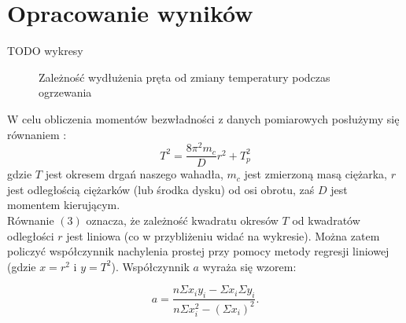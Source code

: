 \documentclass[10pt,a4paper]{article}
\newcommand{\forceindent}{\leavevmode{\parindent=3em\indent}}
\begin{document}
\section{Opracowanie wyników}
TODO wykresy
\begin{figure}[!h]
\centering
{}
\caption{Zależność wydłużenia pręta od zmiany temperatury podczas ogrzewania}
\label{fig:wyk}
\end{figure}

\forceindent W celu obliczenia momentów bezwładności z danych pomiarowych posłużymy się równaniem :
\begin{equation}
T^2 = \frac{8 \pi^2 m_c}{D}r^2 + T_p^2
\end{equation}
gdzie $T$ jest okresem drgań naszego wahadła, $m_c$ jest zmierzoną masą ciężarka, $r$ jest odległością ciężarków (lub środka dysku) od osi obrotu, zaś $D$ jest momentem kierującym.\\
\forceindent Równanie $(3)$ oznacza, że zależność kwadratu okresów $T$ od kwadratów odległości $r$ jest liniowa (co w przybliżeniu widać na wykresie). Można zatem policzyć współczynnik nachylenia prostej przy pomocy metody regresji liniowej (gdzie $x = r^2$ i $y = T^2$). Współczynnik $a$ wyraża się wzorem:

\begin{equation}
a=\frac{n\Sigma x_i y_i - \Sigma x_i \Sigma y_i}{n\Sigma x_i^2 - (\Sigma x_i)^2}.
\end{equation}
\end{document}
